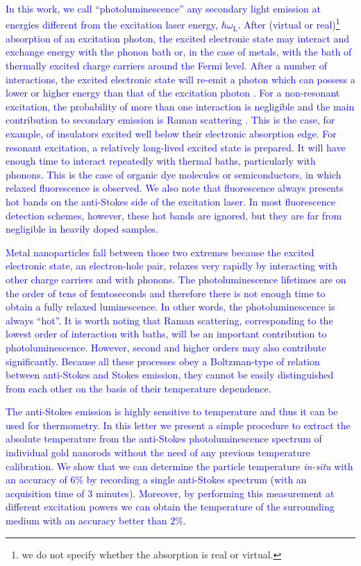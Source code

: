 \documentclass[journal=nalefd,manuscript=letter]{achemso}
\newcommand{\HI}[1]{\textcolor{blue}{#1}} %
\begin{document}
\HI{In this work, we call ``photoluminescence'' any secondary light  emission \cite{orritkottis} at energies
different from the excitation laser energy, $\hbar \omega_\textrm{L}$. After (virtual or 
real)\footnote{we do not specify whether the absorption is real or virtual.} absorption 
of an excitation photon, the excited electronic state \cite{Mooradian1969,Dulkeith2004} 
may interact and exchange energy with the
phonon bath or, in the case of metals, with the bath of thermally excited charge carriers around the
Fermi level. After a number of interactions, the excited electronic state will re-emit a 
photon which can possess a lower or higher energy than that of the excitation photon
\cite{Hodak2000,Giri2015,Arbouet2003a}. For a non-resonant excitation, the probability 
of more than one interaction is negligible and the main contribution to secondary emission 
is Raman scattering \cite{Huang2014}. This is the case, for example, of insulators excited 
well below their electronic absorption edge. For resonant excitation, a relatively long-lived 
excited state is prepared. It will have enough time to interact repeatedly with thermal baths, 
particularly with phonons. This is the case of organic dye molecules or
semiconductors, in which relaxed fluorescence is observed. We also note that fluorescence 
always presents hot bands on the anti-Stokes side of the excitation laser. In most 
fluorescence detection schemes, however, these hot bands are ignored, but they are 
far from negligible in heavily doped samples\cite{Carattino2016a}.}

\HI{Metal nanoparticles fall between those two extremes because the excited electronic state, 
an electron-hole pair, relaxes very rapidly by interacting with other charge carriers and with phonons. 
The photoluminescence lifetimes are on the order of tens of femtoseconds\cite{link1999} and 
therefore there is not enough time to obtain a fully relaxed luminescence. In other words, the 
photoluminescence is always ``hot''. It is worth noting that Raman scattering, 
corresponding to the lowest order of interaction with baths, will be an important
contribution to photoluminescence\cite{Huang2014,mertens2017light}. However, second 
and higher orders may also contribute significantly. Because all these processes obey a 
Boltzman-type of relation between anti-Stokes and Stokes emission, they cannot be easily 
distinguished from each other on the basis of their temperature dependence.}


\HI{The anti-Stokes emission is highly sensitive to temperature and thus 
it can be used for thermometry\cite{xie2016thermometry}. In this letter we present 
a simple procedure to extract the absolute temperature from the anti-Stokes 
photoluminescence spectrum of individual gold nanorods without the need of 
any previous temperature calibration. We show that we can determine the particle temperature 
\textit{in-situ} with an accuracy of $6\%$ by recording a single anti-Stokes spectrum (with an 
acquisition time of $3$ minutes). 
Moreover, by performing this measurement at different excitation powers 
we can obtain the temperature of the surrounding medium with an accuracy better than $2\%$.}
\end{document}
